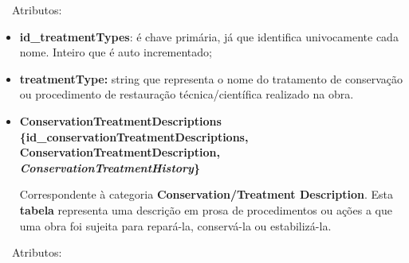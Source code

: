 \documentclass[letterpaper]{article}
\newcommand\textstyleStrongEmphasis[1]{\textbf{#1}}
\newcommand\liststyleLi{%
\renewcommand\labelitemi{{\textbullet}}
\renewcommand\labelitemii{[27A2?]}
\renewcommand\labelitemiii{{\textbullet}}
\renewcommand\labelitemiv{{\textbullet}}
}
\newcommand\liststyleLix{%
\renewcommand\labelitemi{[27A2?]}
\renewcommand\labelitemii{[27A2?]}
\renewcommand\labelitemiii{[27A2?]}
\renewcommand\labelitemiv{[27A2?]}
}
\begin{document}
{
\ \ Atributos:}

\liststyleLix
\begin{itemize}
\item {
\textbf{id\_treatmentTypes}:\textbf{ }\'e chave prim\'aria, j\'a que
identifica univocamente cada nome. Inteiro que \'e auto incrementado;}
\item {
\textbf{treatmentType:} string que representa o nome do tratamento de
conserva\c{c}\~ao ou procedimento de restaura\c{c}\~ao
t\'ecnica/cient\'ifica realizado na obra.}


\bigskip
\end{itemize}
\liststyleLi
\begin{itemize}
\item {\bfseries
ConservationTreatmentDescriptions\textmd{
\{}\textmd{id\_conservationTreatmentDescriptions}\textmd{,
ConservationTreatmentDescription,
}\textmd{\textit{ConservationTreatmentHistory}}\textmd{\}}}

\foreignlanguage{english}{Correspondente \`a categoria
}\foreignlanguage{english}{\textbf{Conservation}}\textstyleStrongEmphasis{\foreignlanguage{english}{/Treatment
Description}}\foreignlanguage{english}{. Esta
}\textstyleStrongEmphasis{\foreignlanguage{english}{\textmd{tabela}}}\foreignlanguage{english}{
representa uma descri\c{c}\~ao em prosa de procedimentos ou a\c{c}\~oes
a que uma obra foi sujeita para repar\'a-la, conserv\'a-la ou
estabiliz\'a-la.}
\end{itemize}

\bigskip

{
\ \ Atributos:}
\end{document}
